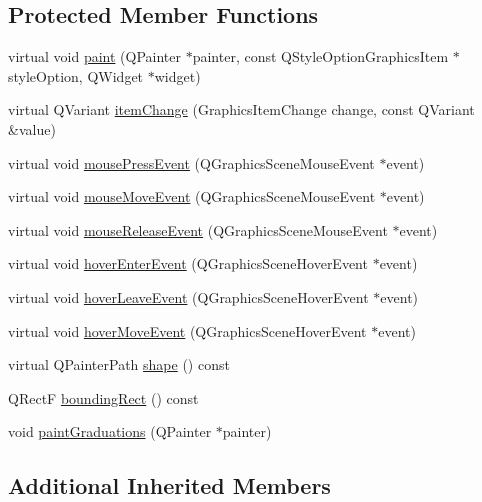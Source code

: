 \subsection*{Protected Member Functions}
\begin{DoxyCompactItemize}
\item 
virtual void \hyperlink{class_u_b_graphics_protractor_a76a1e119106684d95877a04e297ccf2f}{paint} (Q\-Painter $\ast$painter, const Q\-Style\-Option\-Graphics\-Item $\ast$style\-Option, Q\-Widget $\ast$widget)
\item 
virtual Q\-Variant \hyperlink{class_u_b_graphics_protractor_a292bd7b720d1b588454f4a1c3af11b42}{item\-Change} (Graphics\-Item\-Change change, const Q\-Variant \&value)
\item 
virtual void \hyperlink{class_u_b_graphics_protractor_a4ef2805010e225a9cfd3be51928cc08f}{mouse\-Press\-Event} (Q\-Graphics\-Scene\-Mouse\-Event $\ast$event)
\item 
virtual void \hyperlink{class_u_b_graphics_protractor_ae34c1777e0d101e2743dd9a8b85c981e}{mouse\-Move\-Event} (Q\-Graphics\-Scene\-Mouse\-Event $\ast$event)
\item 
virtual void \hyperlink{class_u_b_graphics_protractor_aa2da2187e8a0353e7afdf8655878cbdc}{mouse\-Release\-Event} (Q\-Graphics\-Scene\-Mouse\-Event $\ast$event)
\item 
virtual void \hyperlink{class_u_b_graphics_protractor_a186c7a7e2e4d3bfe7da892c5b531c0aa}{hover\-Enter\-Event} (Q\-Graphics\-Scene\-Hover\-Event $\ast$event)
\item 
virtual void \hyperlink{class_u_b_graphics_protractor_a3761b010a7f13673507f482253b34da1}{hover\-Leave\-Event} (Q\-Graphics\-Scene\-Hover\-Event $\ast$event)
\item 
virtual void \hyperlink{class_u_b_graphics_protractor_aba6cc819f99a86311386c00755125cc3}{hover\-Move\-Event} (Q\-Graphics\-Scene\-Hover\-Event $\ast$event)
\item 
virtual Q\-Painter\-Path \hyperlink{class_u_b_graphics_protractor_a3ca82d4c0b21e40ae5e197347bccdc3a}{shape} () const 
\item 
Q\-Rect\-F \hyperlink{class_u_b_graphics_protractor_a88d81ac6c1399d2507ae16bc86a11e36}{bounding\-Rect} () const 
\item 
void \hyperlink{class_u_b_graphics_protractor_a8d379cb46950fbe841fd0092e8f25681}{paint\-Graduations} (Q\-Painter $\ast$painter)
\end{DoxyCompactItemize}
\subsection*{Additional Inherited Members}


